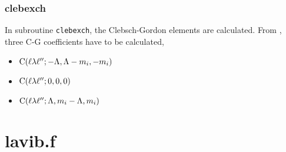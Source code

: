 \documentclass[aps,pra,groupedaddress,
                amsfonts,amssymb,
                preprint
    ]{revtex4}
\newcommand{\code}[1]{\texttt{#1}}
\begin{document}
\subsubsection{clebexch}
In subroutine \code{clebexch}, the Clebsch-Gordon elements are calculated. From , three C-G coefficients have to be calculated,
\begin{itemize}
  \item $\mathrm{C}(\ell\lambda\ell'';-\Lambda,\Lambda-m_i,-m_i)$
  \item $\mathrm{C}(\ell\lambda\ell'';0,0,0)$
  \item $\mathrm{C}(\ell\lambda\ell'';\Lambda,m_i-\Lambda,m_i)$
\end{itemize}
 
\section{lavib.f}


\end{document}

